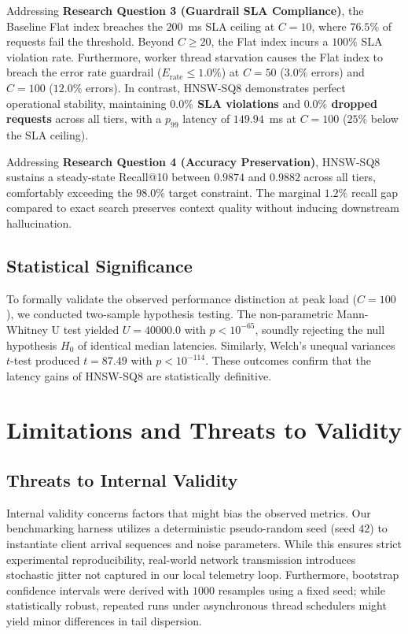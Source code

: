 \documentclass[conference]{IEEEtran}
\begin{document}
Addressing \textbf{Research Question 3 (Guardrail SLA Compliance)}, the Baseline Flat index breaches the $200$~ms SLA ceiling at $C=10$, where $76.5\%$ of requests fail the threshold. Beyond $C \ge 20$, the Flat index incurs a $100\%$ SLA violation rate. Furthermore, worker thread starvation causes the Flat index to breach the error rate guardrail ($E_{\text{rate}} \le 1.0\%$) at $C=50$ ($3.0\%$ errors) and $C=100$ ($12.0\%$ errors). In contrast, HNSW-SQ8 demonstrates perfect operational stability, maintaining \textbf{$0.0\%$ SLA violations} and \textbf{$0.0\%$ dropped requests} across all tiers, with a $p_{99}$ latency of $149.94$~ms at $C=100$ ($25\%$ below the SLA ceiling).

Addressing \textbf{Research Question 4 (Accuracy Preservation)}, HNSW-SQ8 sustains a steady-state Recall@10 between $0.9874$ and $0.9882$ across all tiers, comfortably exceeding the $98.0\%$ target constraint. The marginal $1.2\%$ recall gap compared to exact search preserves context quality without inducing downstream hallucination.

\subsection{Statistical Significance}
To formally validate the observed performance distinction at peak load ($C=100$), we conducted two-sample hypothesis testing. The non-parametric Mann-Whitney U test yielded $U = 40000.0$ with $p < 10^{-65}$, soundly rejecting the null hypothesis $H_0$ of identical median latencies. Similarly, Welch's unequal variances $t$-test produced $t = 87.49$ with $p < 10^{-114}$. These outcomes confirm that the latency gains of HNSW-SQ8 are statistically definitive.

\section{Limitations and Threats to Validity}
\label{sec:limitations}

\subsection{Threats to Internal Validity}
Internal validity concerns factors that might bias the observed metrics. Our benchmarking harness utilizes a deterministic pseudo-random seed (seed $42$) to instantiate client arrival sequences and noise parameters. While this ensures strict experimental reproducibility, real-world network transmission introduces stochastic jitter not captured in our local telemetry loop. Furthermore, bootstrap confidence intervals were derived with $1000$ resamples using a fixed seed; while statistically robust, repeated runs under asynchronous thread schedulers might yield minor differences in tail dispersion.
\end{document}
